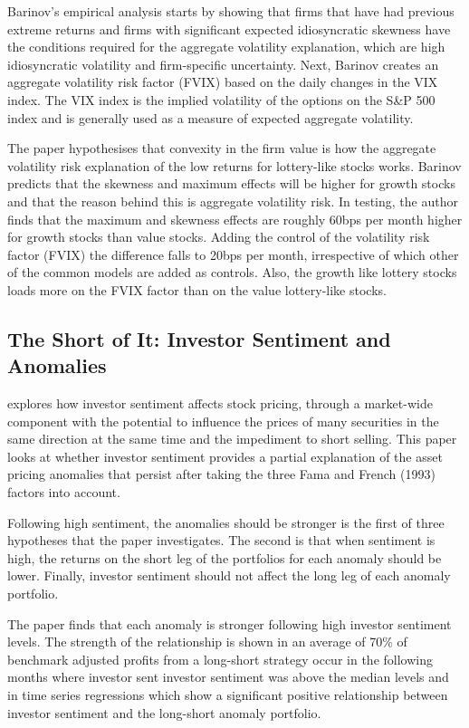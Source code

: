 \documentclass[12pt, a4paper, oneside]{article}
\begin{document}
Barinov’s empirical analysis starts by showing that firms that have had previous extreme returns and firms with significant expected idiosyncratic skewness have the conditions required for the aggregate volatility explanation, which are high idiosyncratic volatility and firm-specific uncertainty. Next, Barinov creates an aggregate volatility risk factor (FVIX) based on the daily changes in the VIX index. The VIX index is the implied volatility of the options on the S\&P 500 index and is generally used as a measure of expected aggregate volatility. 

The paper hypothesises that convexity in the firm value is how the aggregate volatility risk explanation of the low returns for lottery-like stocks works. Barinov predicts that the skewness and maximum effects will be higher for growth stocks and that the reason behind this is aggregate volatility risk. In testing, the author finds that the maximum and skewness effects are roughly 60bps per month higher for growth stocks than value stocks. Adding the control of the volatility risk factor (FVIX) the difference falls to 20bps per month, irrespective of which other of the common models are added as controls. Also, the growth like lottery stocks loads more on the FVIX factor than on the value lottery-like stocks. 

\subsection{The Short of It: Investor Sentiment and Anomalies}
 explores how investor sentiment affects stock pricing, through a market-wide component with the potential to influence the prices of many securities in the same direction at the same time and the impediment to short selling. This paper looks at whether investor sentiment provides a partial explanation of the asset pricing anomalies that persist after taking the three Fama and French (1993) factors into account.

Following high sentiment, the anomalies should be stronger is the first of three hypotheses that the paper investigates. The second is that when sentiment is high, the returns on the short leg of the portfolios for each anomaly should be lower. Finally, investor sentiment should not affect the long leg of each anomaly portfolio. 

The paper finds that each anomaly is stronger following high investor sentiment levels. The strength of the relationship is shown in an average of 70\% of benchmark adjusted profits from a long-short strategy occur in the following months where investor sent investor sentiment was above the median levels and in time series regressions which show a significant positive relationship between investor sentiment and the long-short anomaly portfolio. 
\end{document}
